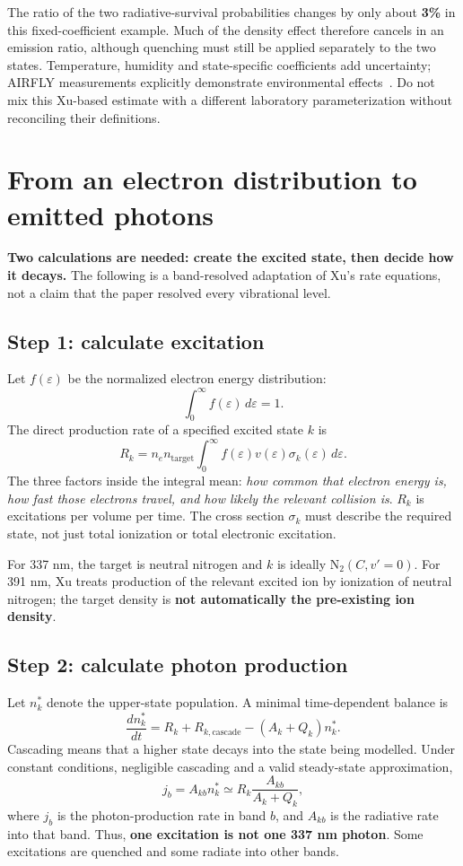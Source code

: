 \documentclass[11pt,a4paper]{article}
\newcommand{\xu}[1]{\cite[#1]{Xu2015}}
\newcommand{\nextsection}[1]{\clearpage\section{#1}}
\begin{document}
The ratio of the two radiative-survival probabilities changes by only about \textbf{3\%} in this fixed-coefficient example. Much of the density effect therefore cancels in an emission ratio, although quenching must still be applied separately to the two states. Temperature, humidity and state-specific coefficients add uncertainty; AIRFLY measurements explicitly demonstrate environmental effects~\cite{AIRFLY2008}. Do not mix this Xu-based estimate with a different laboratory parameterization without reconciling their definitions.

\nextsection{From an electron distribution to emitted photons}
\label{sec:rates}
\textbf{Two calculations are needed: create the excited state, then decide how it decays.} The following is a band-resolved adaptation of Xu's rate equations, not a claim that the paper resolved every vibrational level.\xu{Eqs.~(2)--(3)}

\subsection*{Step 1: calculate excitation}
Let $f(\varepsilon)$ be the normalized electron energy distribution:
\[
\int_0^\infty f(\varepsilon)\,d\varepsilon=1.
\]
The direct production rate of a specified excited state $k$ is
\begin{equation}
 R_k=n_e n_{\mathrm{target}}
 \int_0^\infty f(\varepsilon)v(\varepsilon)
 \sigma_k(\varepsilon)\,d\varepsilon.
 \label{eq:excitation}
\end{equation}
The three factors inside the integral mean: \emph{how common that electron energy is, how fast those electrons travel, and how likely the relevant collision is}. $R_k$ is excitations per volume per time. The cross section $\sigma_k$ must describe the required state, not just total ionization or total electronic excitation.

For 337 nm, the target is neutral nitrogen and $k$ is ideally $\mathrm{N}_2(C,v'=0)$. For 391 nm, Xu treats production of the relevant excited ion by ionization of neutral nitrogen; the target density is \textbf{not automatically the pre-existing ion density}.\xu{Sec.~2.2}

\subsection*{Step 2: calculate photon production}
Let $n_k^*$ denote the upper-state population. A minimal time-dependent balance is
\begin{equation}
 \frac{dn_k^*}{dt}=R_k+R_{k,\mathrm{cascade}}-(A_k+Q_k)n_k^*.
\end{equation}
Cascading means that a higher state decays into the state being modelled. Under constant conditions, negligible cascading and a valid steady-state approximation,
\begin{equation}
 j_b=A_{kb}n_k^*\simeq R_k\frac{A_{kb}}{A_k+Q_k},
 \label{eq:bandyield}
\end{equation}
where $j_b$ is the photon-production rate in band $b$, and $A_{kb}$ is the radiative rate into that band. Thus, \textbf{one excitation is not one 337 nm photon}. Some excitations are quenched and some radiate into other bands.
\end{document}
